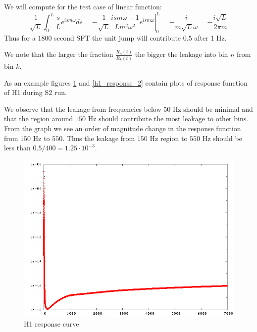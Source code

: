 \documentclass[12pt]{article}
\def\FFTNORM{\frac{1}{\sqrt{ L}}}
\begin{document}
We will compute for the test case of linear function:
$$
\FFTNORM\int_0^{L}\frac{s}{L}e^{ism\omega}ds=-\FFTNORM\left.\frac{ism\omega-1}{Lm^2\omega^2}e^{ism\omega}\right|_0^{L}
 =-\frac{i}{m\sqrt{L}\omega}=-\frac{i\sqrt{L}}{2\pi m}
$$
Thus for a $1800$ second SFT the unit jump will contribute $0.5$ after $1$ Hz.

We note that the larger the fraction $\frac{R_n(t)}{R_k(t)}$ the bigger the leakage
into bin $n$ from bin $k$.

As an example figures \ref{h1_response_1} and \ref{h1_response_2} contain plots
of response function of H1 during S2 run.

We observe that the leakage from frequencies below $50$ Hz should be minimal and that the region
around $150$ Hz should contribute the most leakage to other bins. From the graph we see an order
of magnitude change in the response function from $150$ Hz to $550$. Thus the leakage 
from $150$ Hz region to $550$ Hz should be less than $0.5/400=1.25\cdot 10^{-3}$.


\begin{figure}
\label{h1_response_1}
\centering
\includegraphics[scale=0.5]{S2/h1_response-1.png}
\caption{H1 response curve}
\end{figure}
\end{document}
